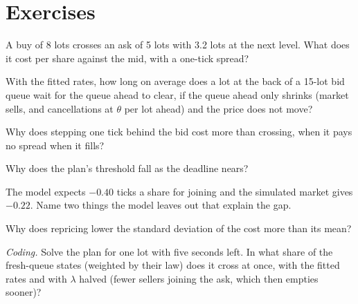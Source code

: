 \section{Exercises}

\begin{exercise}[$\star$]\label{exo:mx:child-order-placement:1}
A buy of 8 lots crosses an ask of 5 lots with 3.2 lots at the next level. What does it cost per share against the mid, with a one-tick spread?
\end{exercise}

\begin{exercise}[$\star$]\label{exo:mx:child-order-placement:2}
With the fitted rates, how long on average does a lot at the back of a 15-lot bid queue wait for the queue ahead to clear, if the queue ahead only
shrinks (market sells, and cancellations at $\theta$ per lot ahead) and the price does not move?
\end{exercise}

\begin{exercise}[$\star$]\label{exo:mx:child-order-placement:3}
Why does stepping one tick behind the bid cost more than crossing, when it pays no spread when it fills?
\end{exercise}

\begin{exercise}[$\star\star$]\label{exo:mx:child-order-placement:4}
Why does the plan's threshold fall as the deadline nears?
\end{exercise}

\begin{exercise}[$\star\star$]\label{exo:mx:child-order-placement:5}
The model expects $-0.40$ ticks a share for joining and the simulated market gives $-0.22$. Name two things the model leaves out that explain the gap.
\end{exercise}

\begin{exercise}[$\star\star$]\label{exo:mx:child-order-placement:6}
Why does repricing lower the standard deviation of the cost more than its mean?
\end{exercise}

\begin{exercise}[$\star\star\star$]\label{exo:mx:child-order-placement:7}
\emph{Coding.} Solve the plan for one lot with five seconds left. In what share of the fresh-queue states (weighted by their law) does it cross at
once, with the fitted rates and with $\lambda$ halved (fewer sellers joining the ask, which then empties sooner)?
\end{exercise}

